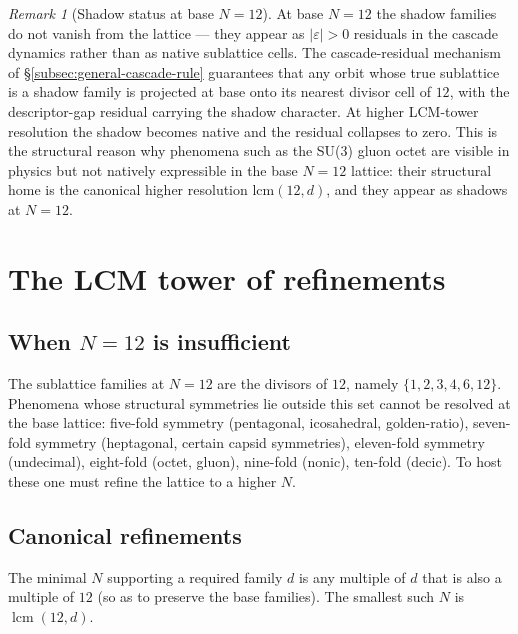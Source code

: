 \documentclass[11pt,a4paper]{article}
\theoremstyle{definition}
\theoremstyle{remark}
\newtheorem{remark}[theorem]{Remark}
\DeclareMathOperator{\lcm}{lcm}
\begin{document}
\begin{remark}[Shadow status at base $N=12$]\label{rem:shadow-base}
At base $N=12$ the shadow families do not vanish from the lattice --- they appear as $|\varepsilon|>0$ residuals in the cascade dynamics rather than as native sublattice cells. The cascade-residual mechanism of \S\ref{subsec:general-cascade-rule} guarantees that any orbit whose true sublattice is a shadow family is projected at base onto its nearest divisor cell of $12$, with the descriptor-gap residual carrying the shadow character. At higher LCM-tower resolution the shadow becomes native and the residual collapses to zero. This is the structural reason why phenomena such as the SU(3) gluon octet are visible in physics but not natively expressible in the base $N=12$ lattice: their structural home is the canonical higher resolution $\mathrm{lcm}(12,d)$, and they appear as shadows at $N=12$.
\end{remark}

\section{The LCM tower of refinements}\label{sec:tower}

\subsection{When $N=12$ is insufficient}

The sublattice families at $N=12$ are the divisors of $12$, namely $\{1,2,3,4,6,12\}$. Phenomena whose structural symmetries lie outside this set cannot be resolved at the base lattice: five-fold symmetry (pentagonal, icosahedral, golden-ratio), seven-fold symmetry (heptagonal, certain capsid symmetries), eleven-fold symmetry (undecimal), eight-fold (octet, gluon), nine-fold (nonic), ten-fold (decic). To host these one must refine the lattice to a higher $N$.

\subsection{Canonical refinements}

The minimal $N$ supporting a required family $d$ is any multiple of $d$ that is also a multiple of $12$ (so as to preserve the base families). The smallest such $N$ is $\lcm(12,d)$.
\end{document}
